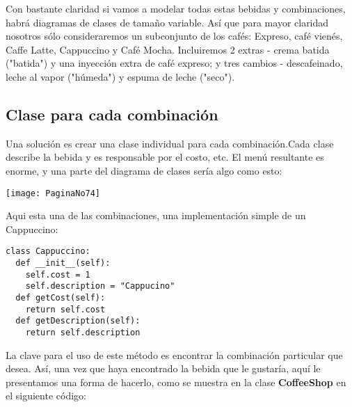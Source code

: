 Con bastante claridad si vamos a modelar todas estas bebidas y combinaciones, habrá diagramas de clases de tamaño variable. Así que para mayor claridad nosotros sólo consideraremos un subconjunto de los cafés: Expreso, café vienés, Caffe Latte,
Cappuccino y Café Mocha. 
Incluiremos 2 extras - crema batida ("batida") y una inyección extra de café expreso; y tres cambios - descafeinado, leche al vapor ("húmeda") y espuma de leche ("seco").   \newline

\subsection*{Clase para cada combinación}
\label{subsec:cpcc}

Una solución es crear una clase individual  para cada combinación.Cada clase describe la bebida y es responsable por el costo, etc. El menú resultante es enorme, y una parte del diagrama de clases sería algo como esto:    \newline

\texttt{[image: PaginaNo74]} 

Aqui esta una de las combinaciones, una implementación simple de un Cappuccino:     \newline

\begin{lstlisting} 
class Cappuccino: 
  def __init__(self): 
    self.cost = 1 
    self.description = "Cappucino" 
  def getCost(self): 
    return self.cost 
  def getDescription(self): 
    return self.description 
\end{lstlisting}

La clave para el uso de este método es encontrar la combinación particular que desea. Así, una vez que haya encontrado la bebida que le gustaría, aquí le presentamos una forma de hacerlo, como se muestra en la clase \textbf{CoffeeShop} en el siguiente código:     \newline

